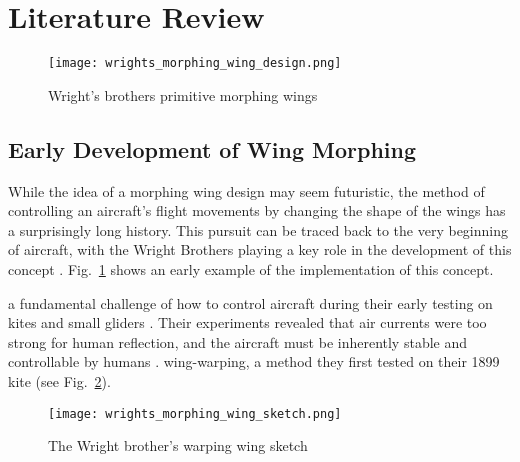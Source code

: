 \section{Literature Review}
\label{sec:related_work}



\begin{figure}
    \centering
    \texttt{[image: wrights\_morphing\_wing\_design.png]}
    \caption{Wright’s brothers primitive morphing wings ~\cite{choi2017idea}}
    \label{fig:wrights_morphing_wing_design}
\end{figure}

\subsection{Early Development of Wing Morphing}
While the idea of a morphing wing design may seem futuristic, the method of controlling an aircraft's flight movements by changing the shape of the wings has a surprisingly long history. This pursuit can be traced back to the very beginning of aircraft, with the Wright Brothers playing a key role in the development of this concept \cite{choi2017idea, nasm2022researching}. Fig.~\ref{fig:wrights_morphing_wing_design} shows an early example of the implementation of this concept. 

 a fundamental challenge of how to control aircraft during their early testing on kites and small gliders \cite{nasm2022researching}. Their experiments revealed that air currents were too strong for human reflection, and the aircraft must be inherently stable and controllable by humans \cite{nasm2022researching}.  wing-warping, a method they first tested on their 1899 kite (see Fig.~\ref{fig:wrights_morphing_wing_sketch}). 



\begin{figure}[h!]
    \centering
    \texttt{[image: wrights\_morphing\_wing\_sketch.png]}
    \caption{The Wright brother’s warping wing sketch~\cite{biolocomotion2011wright}}
    \label{fig:wrights_morphing_wing_sketch}
\end{figure}


